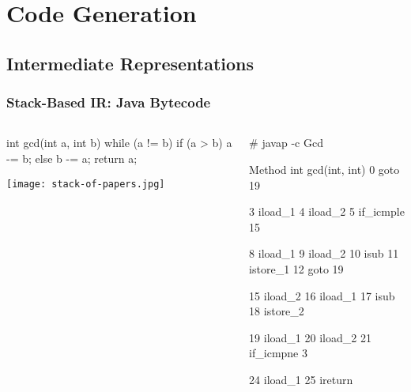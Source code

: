 \documentclass{plt}
\newcommand{\tocbreak}{\addtocontents{toc}{\vfill\protect\pagebreak\null\medskip}}
\begin{document}
\tocbreak

\section{Code Generation}

\subsection{Intermediate Representations}

\begin{frame}[fragile=singleslide]
  \frametitle{Stack-Based IR: Java Bytecode}

  \begin{columns}
    \begin{column}{0.45\textwidth}

\begin{java}
int gcd(int a, int b) {
  while (a != b) {
    if (a > b)
      a -= b;
    else
      b -= a;
  }
  return a;
}
\end{java}

\vspace{2pc}

\texttt{[image: stack-of-papers.jpg]}
    \end{column}
    \begin{column}{0.55\textwidth}
\fontsize{8}{8}\selectfont
\begin{semiverbatim}
# javap -c Gcd

Method int gcd(int, int)
   0 goto 19

   3 iload_1               
   4 iload_2      
   5 if_icmple 15 

   8 iload_1            
   9 iload_2      
  10 isub         
  11 istore_1     
  12 goto 19

  15 iload_2      
  16 iload_1        
  17 isub         
  18 istore_2     

  19 iload_1      
  20 iload_2      
  21 if_icmpne 3  

  24 iload_1      
  25 ireturn      
\end{semiverbatim}
    \end{column}
  \end{columns}

\end{frame}
\end{document}
